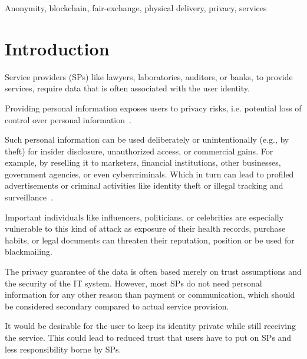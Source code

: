\documentclass{ieeeaccess}
\begin{document}
\begin{keywords}
Anonymity, blockchain, fair-exchange, physical delivery, privacy, services
\end{keywords}

\titlepgskip=-15pt

\maketitle
\section{Introduction}
Service providers (SPs) like lawyers, laboratories, auditors, or banks,
to provide services, require data that is often associated with the user
identity.

Providing personal information exposes users to privacy risks, i.e. potential loss of control over personal
information~\cite{smith2011information}.

Such personal information can be used deliberately or unintentionally
(e.g., by theft) for insider disclosure, unauthorized access, or commercial gains. For example, by reselling it to marketers, financial institutions, other businesses, government agencies, or even cybercriminals. Which in turn can lead to profiled advertisements or criminal activities like identity theft or illegal tracking and surveillance~\cite{smith2011information}.

Important individuals like influencers, politicians, or celebrities are especially vulnerable to this kind of attack as exposure of their health records, purchase habits, or legal documents can threaten their reputation, position or be used for blackmailing.

The privacy guarantee of the data is often based merely on trust assumptions and the security of the IT system. However, most SPs do not need personal information for any other reason than payment or communication, which should be considered secondary compared to actual service provision.

It would be desirable for the user to keep its identity private while still receiving the service. This could lead to reduced trust that users have to put on SPs and less responsibility borne by SPs.
\end{document}
